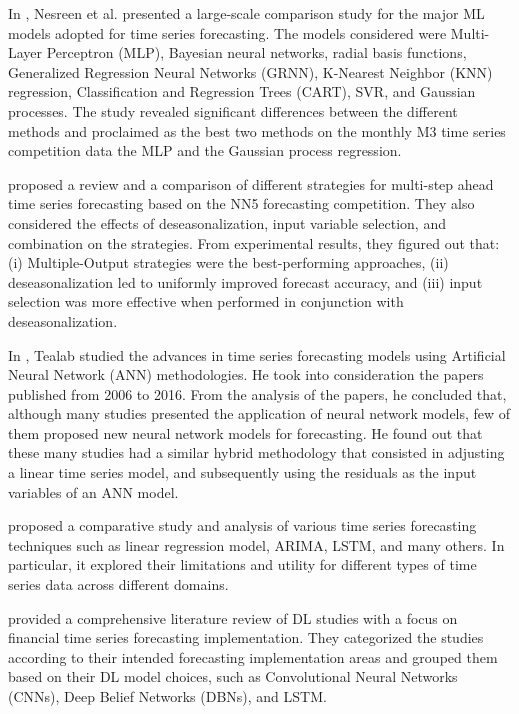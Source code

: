 In \cite{Nesreen2010}, Nesreen et al. presented a large-scale comparison study for the major ML models adopted for time series forecasting.
The models considered were Multi-Layer Perceptron (MLP), Bayesian neural networks, radial basis functions, Generalized Regression Neural Networks (GRNN), K-Nearest Neighbor (KNN) regression, Classification and Regression Trees (CART), SVR, and Gaussian processes.
The study revealed significant differences between the different methods and proclaimed as the best two methods on the monthly M3 time series competition data the MLP and the Gaussian process regression.

\cite{BENTAIEB20127067} proposed a review and a comparison of different strategies for multi-step ahead time series forecasting based on the NN5 forecasting competition.
They also considered the effects of deseasonalization, input variable selection, and combination on the strategies.
From experimental results, they figured out that:
(i) Multiple-Output strategies were the best-performing approaches,
(ii) deseasonalization led to uniformly improved forecast accuracy,
and (iii) input selection was more effective when performed in conjunction with deseasonalization.

In \cite{TEALAB2018334}, Tealab studied the advances in time series forecasting models using Artificial Neural Network (ANN) methodologies.
He took into consideration the papers published from 2006 to 2016.
From the analysis of the papers, he concluded that, although many studies presented the application of neural network models, few of them proposed new neural network models for forecasting.
He found out that these many studies had a similar hybrid methodology that consisted in adjusting a linear time series model, and subsequently using the residuals as the input variables of an ANN model.

\cite{Athiyarath2020} proposed a comparative study and analysis of various time series forecasting techniques such as linear regression model, ARIMA, LSTM, and many others.
In particular, it explored their limitations and utility for different types of time series data across different domains.

\cite{SEZER2020106181} provided a comprehensive literature review of DL studies with a focus on financial time series forecasting implementation.
They categorized the studies according to their intended forecasting implementation areas and grouped them based on their DL model choices, such as Convolutional Neural Networks (CNNs), Deep Belief Networks (DBNs), and LSTM.

